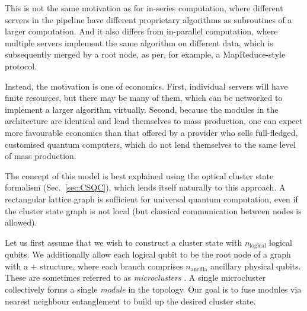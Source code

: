 \documentclass[aps,rmp,twocolumn,amsmath,amssymb,nofootinbib,superscriptaddress]{revtex4}
\begin{document}
This is not the same motivation as for in-series computation, where different servers in the pipeline have different proprietary algorithms as subroutines of a larger computation. And it also differs from in-parallel computation, where multiple servers implement the same algorithm on different data, which is subsequently merged by a root node, as per, for example, a {\sc MapReduce}-style protocol.

Instead, the motivation is one of economics. First, individual servers will have finite resources, but there may be many of them, which can be networked to implement a larger algorithm virtually. Second, because the modules in the architecture are identical and lend themselves to mass production, one can expect more favourable economics than that offered by a provider who sells full-fledged, customised quantum computers, which do not lend themselves to the same level of mass production.

The concept of this model is best explained using the optical cluster state formalism (Sec.~\ref{sec:CSQC}), which lends itself naturally to this approach. A rectangular lattice graph is sufficient for universal quantum computation, even if the cluster state graph is not local (but classical communication between nodes is allowed).

Let us first assume that we wish to construct a cluster state with $n_\mathrm{logical}$ logical qubits. We additionally allow each logical qubit to be the root node of a graph with a $+$ structure, where each branch comprises $n_\mathrm{ancilla}$ ancillary physical qubits. These are sometimes referred to as \emph{microclusters} \cite{bib:Nielsen04}. A single microcluster collectively forms a single \emph{module} in the topology. Our goal is to fuse modules via nearest neighbour entanglement to build up the desired cluster state.
\end{document}
